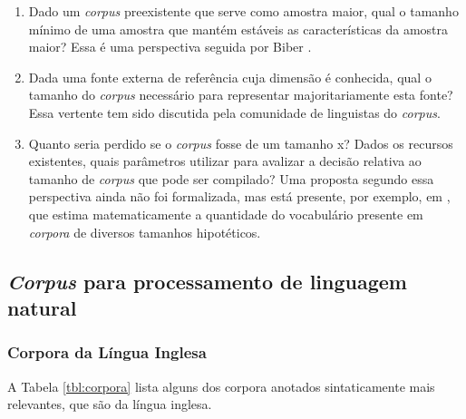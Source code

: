 \begin{enumerate}
\begin{enumerate}
\item Dado um \emph{corpus} preexistente que serve como amostra maior, qual o tamanho mínimo de uma amostra que mantém estáveis as características da amostra maior? Essa é uma perspectiva seguida por Biber \cite{biber90,biber93}.

\item Dada uma fonte externa de referência cuja dimensão é conhecida, qual o tamanho do \emph{corpus} necessário para representar majoritariamente esta fonte? Essa vertente tem sido discutida pela comunidade de linguistas do \emph{corpus}.

\item Quanto seria perdido se o \emph{corpus} fosse de um tamanho x? Dados os recursos existentes, quais parâmetros utilizar para avalizar a decisão relativa ao tamanho de \emph{corpus} que pode ser compilado? Uma proposta segundo essa perspectiva ainda não foi formalizada, mas está presente, por exemplo, em \cite{cantossanches97.2,cantossanchez97}, que estima matematicamente a quantidade do vocabulário presente em \emph{corpora} de diversos tamanhos hipotéticos.
\end{enumerate}

\end{enumerate}

\newpage

\subsection{\emph{Corpus} para processamento de linguagem natural} %
\label{sub:corpus_pln}


\subsubsection{Corpora da Língua Inglesa}
\label{sub:corpus_ingles}

A Tabela \ref{tbl:corpora} lista alguns dos corpora anotados sintaticamente mais relevantes, que são da língua inglesa.

